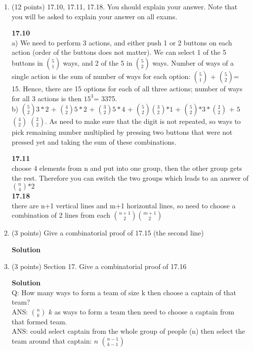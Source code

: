 \documentclass[12pt]{article}
\begin{document}
\begin{enumerate}
\item (12 points)  17.10, 17.11, 17.18.  You should explain your answer.  Note that you will be asked to explain your answer on all exams.

\textbf{17.10} \\
a) We need to perform 3 actions, and either push 1 or 2 buttons on each action (order of the buttons does not matter). We can select 1 of the 5 buttons in ${5 \choose 1}$ ways, and 2 of the 5 in ${5 \choose 2}$ ways. Number of ways of a single action is the sum of number of ways for each option: ${5 \choose 1}$ + ${5 \choose 2}$= 15. Hence, there are 15 options for each of all three actions; number of ways for all 3 actions is then $15^{3}$= 3375. \\ 

b) $5 \choose 2$$3*2$ + $4 \choose 2$$5*2$ + $3 \choose 2$$5*4$ + $5 \choose 2$$3 \choose 2$$*1$ + $5 \choose 2$$*3*$$2 \choose 2$ + $5$ $4 \choose 2$ $2 \choose 2$. As need to make sure that the digit is not repeated, so ways to pick remaining number multiplied by pressing two buttons that were not pressed yet and taking the sum of these combinations.

\textbf{ 17.11} \\
 choose 4 elements from n and put into one group, then the other group gets the rest. Therefore you can switch the two groups which leads to an answer of $n \choose 4$$*2$  \\

\textbf{17.18} \\
there are n+1 vertical lines and m+1 horizontal lines, so need to choose a combination of 2 lines from each $n+1 \choose 2$$m+1 \choose 2$ \\


\item (3 points)  Give a combinatorial proof of 17.15 (the second line)  

\textbf{Solution} \\


\item (3 points) Section 17.  Give a combinatorial proof of 17.16 

\textbf{Solution} \\ 
Q: How many ways to form a team of size k then choose a captain of that team? \\ 
ANS: $n \choose k$ $k$ as ways to form a team then need to choose a captain from that formed team. \\
ANS: could select captain from the whole group of people (n) then select the team around that captain: $n$ $n-1 \choose k-1$



\end{enumerate}
\end{document}
